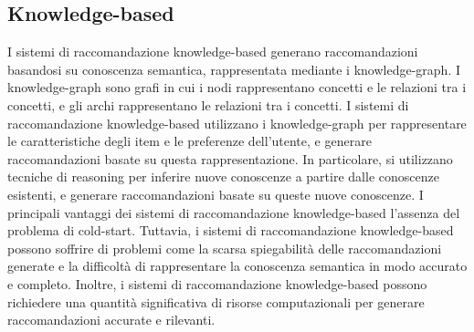 \subsection{Knowledge-based}
I sistemi di raccomandazione knowledge-based generano raccomandazioni basandosi su conoscenza semantica, rappresentata mediante i knowledge-graph. I knowledge-graph sono grafi in cui i nodi rappresentano concetti e le relazioni tra i concetti, e gli archi rappresentano le relazioni tra i concetti. I sistemi di raccomandazione knowledge-based utilizzano i knowledge-graph per rappresentare le caratteristiche degli item e le preferenze dell'utente, e generare raccomandazioni basate su questa rappresentazione. In particolare, si utilizzano tecniche di reasoning per inferire nuove conoscenze a partire dalle conoscenze esistenti, e generare raccomandazioni basate su queste nuove conoscenze. I principali vantaggi dei sistemi di raccomandazione knowledge-based l'assenza del problema di cold-start. Tuttavia, i sistemi di raccomandazione knowledge-based possono soffrire di problemi come la scarsa spiegabilità delle raccomandazioni generate e la difficoltà di rappresentare la conoscenza semantica in modo accurato e completo. Inoltre, i sistemi di raccomandazione knowledge-based possono richiedere una quantità significativa di risorse computazionali per generare raccomandazioni accurate e rilevanti.\\

